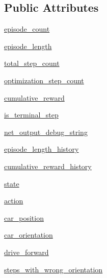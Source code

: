\subsection*{Public Attributes}
\begin{DoxyCompactItemize}
\item 
\hyperlink{classtrain_1_1_q_learning_training_node_a5bef341c2aa0b019a190efb961701cdc}{episode\+\_\+count}
\item 
\hyperlink{classtrain_1_1_q_learning_training_node_abaa1cd9793d6724977d7b9451e36bc3b}{episode\+\_\+length}
\item 
\hyperlink{classtrain_1_1_q_learning_training_node_aa583fe782e5ae47cc64dd44b92fd2e71}{total\+\_\+step\+\_\+count}
\item 
\hyperlink{classtrain_1_1_q_learning_training_node_a876c1cedd4eabcca4e9a0ee6e0922752}{optimization\+\_\+step\+\_\+count}
\item 
\hyperlink{classtrain_1_1_q_learning_training_node_a4c632e44085797e564501bba836b7359}{cumulative\+\_\+reward}
\item 
\hyperlink{classtrain_1_1_q_learning_training_node_a0f8d5e71ae52a959d5248f57ac55829a}{is\+\_\+terminal\+\_\+step}
\item 
\hyperlink{classtrain_1_1_q_learning_training_node_a5837c478232e1d4cc646bfbadbdd2ff2}{net\+\_\+output\+\_\+debug\+\_\+string}
\item 
\hyperlink{classtrain_1_1_q_learning_training_node_af81cfd1d0306828d0ff901faf85df6b3}{episode\+\_\+length\+\_\+history}
\item 
\hyperlink{classtrain_1_1_q_learning_training_node_aa25b9712eebb6aed6befa421814472b4}{cumulative\+\_\+reward\+\_\+history}
\item 
\hyperlink{classtrain_1_1_q_learning_training_node_a6e860eb510dc030f536d26c2a3fcc33c}{state}
\item 
\hyperlink{classtrain_1_1_q_learning_training_node_ad42c35a16230d89d787b5a3a74808edf}{action}
\item 
\hyperlink{classtrain_1_1_q_learning_training_node_ac802eca257307ce6c83897c612aa5f90}{car\+\_\+position}
\item 
\hyperlink{classtrain_1_1_q_learning_training_node_a016d2adc85428e64903703974f8cd79c}{car\+\_\+orientation}
\item 
\hyperlink{classtrain_1_1_q_learning_training_node_a400f047c3086a321f255b2405f2ebe1f}{drive\+\_\+forward}
\item 
\hyperlink{classtrain_1_1_q_learning_training_node_a87a28e543665823ac18758f6a4460d7a}{steps\+\_\+with\+\_\+wrong\+\_\+orientation}

\end{DoxyCompactItemize}
